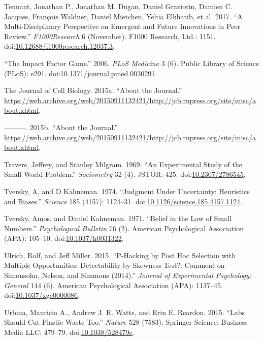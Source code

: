 \documentclass[a5paper]{book}
\begin{document}
\hypertarget{ref-doi:10.12688ux2ff1000research.12037.3}{}
Tennant, Jonathan P., Jonathan M. Dugan, Daniel Graziotin, Damien C.
Jacques, François Waldner, Daniel Mietchen, Yehia Elkhatib, et al. 2017.
``A Multi-Disciplinary Perspective on Emergent and Future Innovations in
Peer Review.'' \emph{F1000Research} 6 (November). F1000 Research, Ltd.:
1151.
doi:\href{https://doi.org/10.12688/f1000research.12037.3}{10.12688/f1000research.12037.3}.

\hypertarget{ref-doi:10.1371ux2fjournal.pmed.0030291}{}
``The Impact Factor Game.'' 2006. \emph{PLoS Medicine} 3 (6). Public
Library of Science (PLoS): e291.
doi:\href{https://doi.org/10.1371/journal.pmed.0030291}{10.1371/journal.pmed.0030291}.

\hypertarget{ref-cellbio2015}{}
The Journal of Cell Biology. 2015a. ``About the Journal.''
\url{https://web.archive.org/web/20150911132421/http://jcb.rupress.org/site/misc/about.xhtml}.

\hypertarget{ref-The_Journal_of_Cell_Biology2015-vh}{}
---------. 2015b. ``About the Journal.''
\url{https://web.archive.org/web/20150911132421/http://jcb.rupress.org/site/misc/about.xhtml}.

\hypertarget{ref-doi:10.2307ux2f2786545}{}
Travers, Jeffrey, and Stanley Milgram. 1969. ``An Experimental Study of
the Small World Problem.'' \emph{Sociometry} 32 (4). JSTOR: 425.
doi:\href{https://doi.org/10.2307/2786545}{10.2307/2786545}.

\hypertarget{ref-doi:10.1126ux2fscience.185.4157.1124}{}
Tversky, A, and D Kahneman. 1974. ``Judgment Under Uncertainty:
Heuristics and Biases.'' \emph{Science} 185 (4157): 1124--31.
doi:\href{https://doi.org/10.1126/science.185.4157.1124}{10.1126/science.185.4157.1124}.

\hypertarget{ref-doi:10.1037ux2fh0031322}{}
Tversky, Amos, and Daniel Kahneman. 1971. ``Belief in the Law of Small
Numbers.'' \emph{Psychological Bulletin} 76 (2). American Psychological
Association (APA): 105--10.
doi:\href{https://doi.org/10.1037/h0031322}{10.1037/h0031322}.

\hypertarget{ref-doi:10.1037ux2fxge0000086}{}
Ulrich, Rolf, and Jeff Miller. 2015. ``P-Hacking by Post Hoc Selection
with Multiple Opportunities: Detectability by Skewness Test?: Comment on
Simonsohn, Nelson, and Simmons (2014).'' \emph{Journal of Experimental
Psychology: General} 144 (6). American Psychological Association (APA):
1137--45.
doi:\href{https://doi.org/10.1037/xge0000086}{10.1037/xge0000086}.

\hypertarget{ref-doi:10.1038ux2f528479c}{}
Urbina, Mauricio A., Andrew J. R. Watts, and Erin E. Reardon. 2015.
``Labs Should Cut Plastic Waste Too.'' \emph{Nature} 528 (7583).
Springer Science; Business Media LLC: 479--79.
doi:\href{https://doi.org/10.1038/528479c}{10.1038/528479c}.
\end{document}
